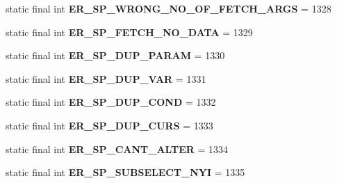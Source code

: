 \begin{DoxyCompactItemize}
static final int {\bfseries E\+R\+\_\+\+S\+P\+\_\+\+W\+R\+O\+N\+G\+\_\+\+N\+O\+\_\+\+O\+F\+\_\+\+F\+E\+T\+C\+H\+\_\+\+A\+R\+GS} = 1328
\item 
\mbox{\label{classcom_1_1mysql_1_1cj_1_1exceptions_1_1_mysql_error_numbers_a4e7888e60ec60612176a60652612833c}} 
static final int {\bfseries E\+R\+\_\+\+S\+P\+\_\+\+F\+E\+T\+C\+H\+\_\+\+N\+O\+\_\+\+D\+A\+TA} = 1329
\item 
\mbox{\label{classcom_1_1mysql_1_1cj_1_1exceptions_1_1_mysql_error_numbers_aceaf469d1bde742ac10ca3bd7871317d}} 
static final int {\bfseries E\+R\+\_\+\+S\+P\+\_\+\+D\+U\+P\+\_\+\+P\+A\+R\+AM} = 1330
\item 
\mbox{\label{classcom_1_1mysql_1_1cj_1_1exceptions_1_1_mysql_error_numbers_a92714d37aff16ea6c00d2fd79feec3c5}} 
static final int {\bfseries E\+R\+\_\+\+S\+P\+\_\+\+D\+U\+P\+\_\+\+V\+AR} = 1331
\item 
\mbox{\label{classcom_1_1mysql_1_1cj_1_1exceptions_1_1_mysql_error_numbers_a82e20808243b60255c4c1662d5041574}} 
static final int {\bfseries E\+R\+\_\+\+S\+P\+\_\+\+D\+U\+P\+\_\+\+C\+O\+ND} = 1332
\item 
\mbox{\label{classcom_1_1mysql_1_1cj_1_1exceptions_1_1_mysql_error_numbers_aaf8ced9a3064384882be9ae599a15ccf}} 
static final int {\bfseries E\+R\+\_\+\+S\+P\+\_\+\+D\+U\+P\+\_\+\+C\+U\+RS} = 1333
\item 
\mbox{\label{classcom_1_1mysql_1_1cj_1_1exceptions_1_1_mysql_error_numbers_a746e1bc8bc16896d94dc8c85c6b12ff5}} 
static final int {\bfseries E\+R\+\_\+\+S\+P\+\_\+\+C\+A\+N\+T\+\_\+\+A\+L\+T\+ER} = 1334
\item 
\mbox{\label{classcom_1_1mysql_1_1cj_1_1exceptions_1_1_mysql_error_numbers_a74479428b5ffc88c97d3313d462af93a}} 
static final int {\bfseries E\+R\+\_\+\+S\+P\+\_\+\+S\+U\+B\+S\+E\+L\+E\+C\+T\+\_\+\+N\+YI} = 1335

\end{DoxyCompactItemize}
